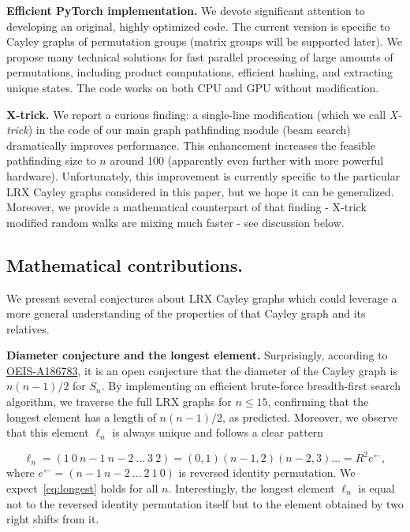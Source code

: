 \documentclass[reqno,11pt]{amsart}
\begin{document}
{\bf Efficient PyTorch implementation.} We devote significant attention to developing an original, highly optimized code. The current version is specific to Cayley graphs of permutation groups (matrix groups will be supported later). We propose many technical solutions for fast parallel processing of large amounts of permutations, including product computations, efficient hashing, and extracting unique states. The code works on both CPU and GPU without modification.

{\bf X-trick.} We report a curious finding: a single-line modification (which we call \textit{X-trick})  in the code of our main graph pathfinding module (beam search) dramatically improves performance. This enhancement increases the feasible pathfinding size
to $n$ around 100 (apparently even further with more powerful hardware). Unfortunately, this improvement is currently specific to the particular LRX Cayley graphs considered in this paper, but we hope it can be generalized. 
Moreover, we provide a mathematical counterpart of that finding - X-trick modified random walks are mixing much faster - see discussion below. 

\subsection{Mathematical contributions.} 

We present several conjectures about LRX Cayley graphs which could leverage a more general understanding of the properties of that Cayley graph and its relatives.


{\bf Diameter conjecture and the longest element.} Surprisingly, according to \href{https://oeis.org/A186783}{OEIS-A186783}, it is an open conjecture that the diameter of the Cayley graph is $n(n-1)/2$ for $S_n$. 
By implementing an efficient brute-force breadth-first search algorithm, we traverse the full LRX graphs for $n\le 15$, confirming that the longest element has a length of $n(n-1)/2$, as predicted. Moreover, we observe that this element $\ell_n$ is always unique and follows a clear pattern

\begin{equation}
\label{eq:longest}
    \ell_n = (1 \ 0 \ n-1\ n-2\ \ldots\ 3\ 2) = (0,1)(n-1,2)(n-2,3)\ldots = R^2 e^{\leftarrow},
\end{equation}
where $e^{\leftarrow} = (n-1 \ n-2 \ \ldots \ 2 \ 1\ 0)$ is reversed identity permutation.
We expect~\eqref{eq:longest} holds for all $n$. Interestingly, the longest element $\ell_n$ is equal not to the reversed identity permutation itself but to the element obtained by two right shifts from it.
\end{document}
